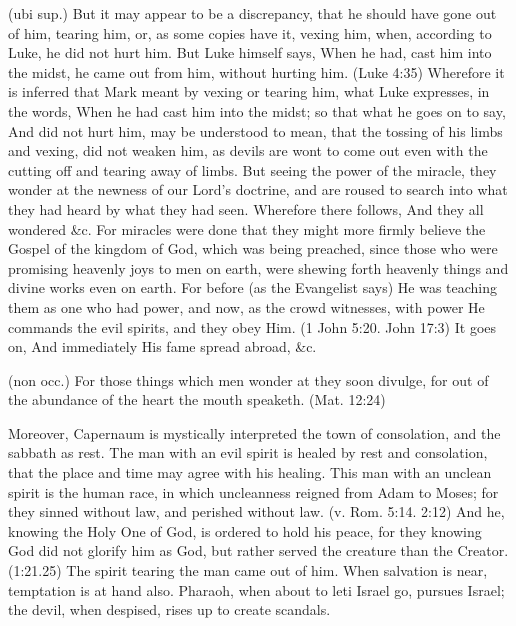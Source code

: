  (ubi sup.) But it may appear to be a discrepancy, that he should have gone out of him, tearing him, or, as some copies have it, vexing him, when, according to Luke, he did not hurt him. But Luke himself says, When he had, cast him into the midst, he came out from him, without hurting him. (Luke 4:35) Wherefore it is inferred that Mark meant by vexing or tearing him, what Luke expresses, in the words, When he had cast him into the midst; so that what he goes on to say, And did not hurt him, may be understood to mean, that the tossing of his limbs and vexing, did not weaken him, as devils are wont to come out even with the cutting off and tearing away of limbs. But seeing the power of the miracle, they wonder at the newness of our Lord’s doctrine, and are roused to search into what they had heard by what they had seen. Wherefore there follows, And they all wondered \&c. For miracles were done that they might more firmly believe the Gospel of the kingdom of God, which was being preached, since those who were promising heavenly joys to men on earth, were shewing forth heavenly things and divine works even on earth. For before (as the Evangelist says) He was teaching them as one who had power, and now, as the crowd witnesses, with power He commands the evil spirits, and they obey Him. (1 John 5:20. John 17:3) It goes on, And immediately His fame spread abroad, \&c.

 (non occ.) For those things which men wonder at they soon divulge, for out of the abundance of the heart the mouth speaketh. (Mat. 12:24)

 Moreover, Capernaum is mystically interpreted the town of consolation, and the sabbath as rest. The man with an evil spirit is healed by rest and consolation, that the place and time may agree with his healing. This man with an unclean spirit is the human race, in which uncleanness reigned from Adam to Moses; for they sinned without law, and perished without law. (v. Rom. 5:14. 2:12) And he, knowing the Holy One of God, is ordered to hold his peace, for they knowing God did not glorify him as God, but rather served the creature than the Creator. (1:21.25) The spirit tearing the man came out of him. When salvation is near, temptation is at hand also. Pharaoh, when about to leti Israel go, pursues Israel; the devil, when despised, rises up to create scandals.

 

